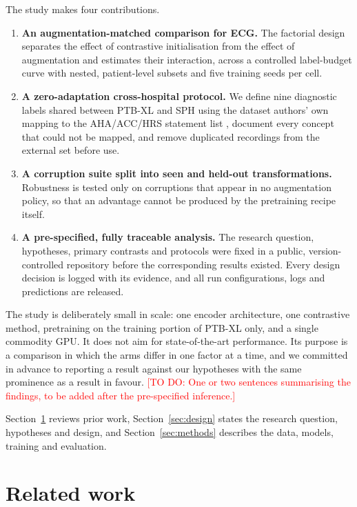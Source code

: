 \documentclass[preprint,12pt]{elsarticle}
\newcommand{\todo}[1]{\textcolor{red}{[TO DO: #1]}}
\begin{document}
The study makes four contributions.
\begin{enumerate}
  \item \textbf{An augmentation-matched comparison for ECG.} The factorial design separates the effect of contrastive initialisation from the effect of augmentation and estimates their interaction, across a controlled label-budget curve with nested, patient-level subsets and five training seeds per cell.
  \item \textbf{A zero-adaptation cross-hospital protocol.} We define nine diagnostic labels shared between PTB-XL and SPH using the dataset authors' own mapping to the AHA/ACC/HRS statement list \cite{mason2007}, document every concept that could not be mapped, and remove duplicated recordings from the external set before use.
  \item \textbf{A corruption suite split into seen and held-out transformations.} Robustness is tested only on corruptions that appear in no augmentation policy, so that an advantage cannot be produced by the pretraining recipe itself.
  \item \textbf{A pre-specified, fully traceable analysis.} The research question, hypotheses, primary contrasts and protocols were fixed in a public, version-controlled repository before the corresponding results existed. Every design decision is logged with its evidence, and all run configurations, logs and predictions are released.
\end{enumerate}

The study is deliberately small in scale: one encoder architecture, one contrastive method, pretraining on the training portion of PTB-XL only, and a single commodity GPU. It does not aim for state-of-the-art performance. Its purpose is a comparison in which the arms differ in one factor at a time, and we committed in advance to reporting a result against our hypotheses with the same prominence as a result in favour. \todo{One or two sentences summarising the findings, to be added after the pre-specified inference.}

Section~\ref{sec:related} reviews prior work, Section~\ref{sec:design} states the research question, hypotheses and design, and Section~\ref{sec:methods} describes the data, models, training and evaluation.

\section{Related work}
\label{sec:related}
\end{document}
